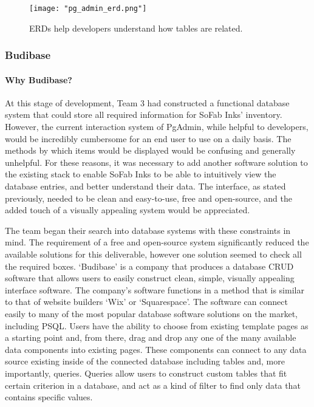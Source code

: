 \documentclass{article}
\begin{document}
\begin{figure}[h!]
    \centering
    \texttt{[image: "pg\_admin\_erd.png"]}
    \caption{ERDs help developers understand how tables are related.}
    \label{fig:pg_admin_erd}
\end{figure}
\FloatBarrier

\subsubsection{Budibase}
\paragraph{Why Budibase?}
At this stage of development, Team 3 had constructed a functional database system that could store all required information for SoFab 
Inks' inventory. However, the current interaction system of PgAdmin, while helpful to developers, would be incredibly cumbersome 
for an end user to use on a daily basis. The methods by which items would be displayed would be confusing and generally unhelpful. For 
these reasons, it was necessary to add another software solution to the existing stack to enable SoFab Inks to be able to intuitively 
view the database entries, and better understand their data. The interface, as stated previously, needed to be clean and easy-to-use, 
free and open-source, and the added touch of a visually appealing system would be appreciated. 

The team began their search into database systems with these constraints in mind. The requirement of a free and open-source system 
significantly reduced the available solutions for this deliverable, however one solution seemed to check all the required boxes. 
`Budibase' is a company that produces a database CRUD software that allows users to easily construct clean, simple, visually appealing
interface software. The company's software functions in a method that is similar to that of website builders `Wix' or `Squarespace'. 
The software can connect easily to many of the most popular database software solutions on the market, including PSQL. 
Users have the ability to choose from existing template pages as a starting point and, from there, drag and drop any one of the many 
available data components into existing pages. These components can connect to any data source existing inside of the connected database
including tables and, more importantly, queries. Queries allow users to construct custom tables that fit certain criterion in a database,
and act as a kind of filter to find only data that contains specific values. 
\end{document}
